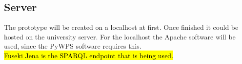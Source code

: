 \subsection{Server}
The prototype will be created on a localhost at first. Once finished it could be hosted on the university server. For the localhost the Apache software will be used, since the PyWPS software requires this. \\
\hl{Fuseki Jena is the SPARQL endpoint that is being used.}








  

